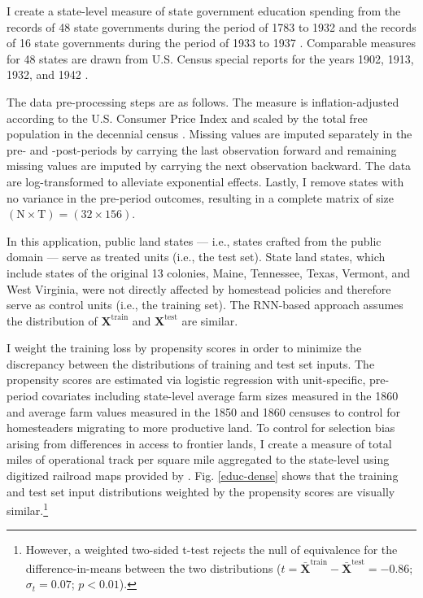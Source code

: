 I create a state-level measure of state government education spending from the records of 48 state governments during the period of 1783 to 1932 \citep{sylla1993sources} and the records of 16 state governments during the period of 1933 to 1937 \citep{sylla1995sourcesa,sylla1995sourcesb}. Comparable measures for 48 states are drawn from U.S. Census special reports for the years 1902, 1913, 1932, and 1942 \citep{haines2010}.

The data pre-processing steps are as follows. The measure is inflation-adjusted according to the U.S. Consumer Price Index \citep{williamson2017seven} and scaled by the total free population in the decennial census \citep{haines2010}. Missing values are imputed separately in the pre- and -post-periods by carrying the last observation forward and remaining missing values are imputed by carrying the next observation backward. The data are log-transformed to alleviate exponential effects. Lastly, I remove states with no variance in the pre-period outcomes, resulting in a complete matrix of size $(\text{N} \times \text{T})= (32 \times 156)$. 

In this application, public land states --- i.e., states crafted from the public domain --- serve as treated units (i.e., the test set). State land states, which include states of the original 13 colonies, Maine, Tennessee, Texas, Vermont, and West Virginia, were not directly affected by homestead policies and therefore serve as control units (i.e., the training set). The RNN-based approach assumes the distribution of $\boldsymbol{X}^{\text{train}}$ and $\boldsymbol{X}^{\text{test}}$ are similar.

I weight the training loss by  propensity scores in order to minimize the discrepancy between the distributions of training and test set inputs. The propensity scores are estimated via logistic regression with unit-specific, pre-period covariates including state-level average farm sizes measured in the 1860 and average farm values measured in the 1850 and 1860 censuses \citep{haines2010} to control for homesteaders migrating to more productive land. To control for selection bias arising from differences in access to frontier lands, I create a measure of total miles of operational track per square mile aggregated to the state-level using digitized railroad maps provided by \citet{atack2013use}. Fig. \ref{educ-dense} shows that the training and test set input distributions weighted by the propensity scores are visually similar.\footnote{However, a weighted two-sided t-test rejects the null of equivalence for the difference-in-means between the two distributions ($t= \boldsymbol{\bar{X}}^{\text{train}} - \boldsymbol{\bar{X}}^{\text{test}} = -0.86$; $\sigma_t = 0.07$; $p < 0.01$).}

